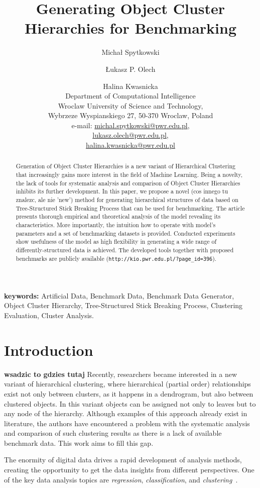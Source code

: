 \documentclass{article}
\title{Generating Object Cluster Hierarchies for Benchmarking}
\author{Micha\l{} Spytkowski \and \L{}ukasz P. Olech \and Halina Kwasnicka \\ Department of Computational Intelligence\\ Wroclaw University of Science and Technology, \\ Wybrzeze Wyspianskiego 27, 50-370 Wroclaw, Poland\\ e-mail: \url{michal.spytkowski@pwr.edu.pl}, \\ \url{lukasz.olech@pwr.edu.pl}, \\ \url{halina.kwasnicka@pwr.edu.pl}}
\begin{document}
\maketitle

\begin{abstract}
	Generation of Object Cluster Hierarchies is a new variant of Hierarchical Clustering that increasingly gains more interest in the field of Machine Learning. Being a novelty, the lack of tools for systematic analysis and comparison of Object Cluster Hierarchies inhibits its further development. In this paper, we propose a novel (cos innego tu znalezc, ale nie 'new') method for generating hierarchical structures of data based on Tree-Structured Stick Breaking Process that can be used for benchmarking. The article presents thorough empirical and theoretical analysis of the model revealing its characteristics. More importantly, the intuition how to operate with model's parameters and a set of benchmarking datasets is provided. Conducted experiments show usefulness of the model as high flexibility in generating a wide range of differently-structured data is achieved. The developed tools together with proposed benchmarks are publicly available (\texttt{http://kio.pwr.edu.pl/?page\_id=396}).
\end{abstract}

\textbf{keywords:} Artificial Data, Benchmark Data, Benchmark Data Generator, Object Cluster Hierarchy, Tree-Structured Stick Breaking Process, Clustering Evaluation, Cluster Analysis.

\section{Introduction}

\textbf{wsadzic to gdzies tutaj}
Recently, researchers became interested in a new variant of hierarchical clustering, where hierarchical (partial order) relationships exist not only between clusters, as it happens in a dendrogram, but also between clustered objects. In this variant objects can be assigned not only to leaves but to any node of the hierarchy. Although examples of this approach already exist in literature, the authors have encountered a problem with the systematic analysis and comparison of such clustering results as there is a lack of available benchmark data. This work aims to fill this gap. 


The enormity of digital data drives a rapid development of analysis methods, creating the opportunity to get the data insights from different perspectives. One of the key data analysis topics are \textit{regression}, \textit{classification}, and \textit{clustering}~\cite{Kakkar2014,Dash2003109,Xu:2005:SCA:2325810.2327433}.
\end{document}
